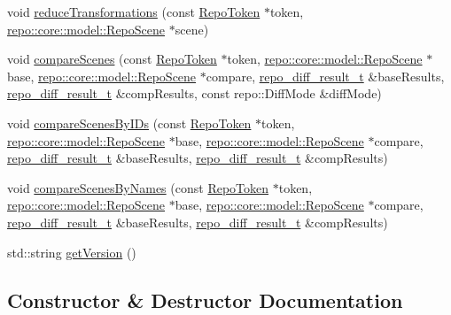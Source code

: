 \begin{DoxyCompactItemize}
void \hyperlink{classrepo_1_1_repo_controller_af77b1253d7a6b6cf00fc94764a3bc03a}{reduce\+Transformations} (const \hyperlink{class_repo_controller_1_1_repo_token}{Repo\+Token} $\ast$token, \hyperlink{classrepo_1_1core_1_1model_1_1_repo_scene}{repo\+::core\+::model\+::\+Repo\+Scene} $\ast$scene)
\item 
void \hyperlink{classrepo_1_1_repo_controller_a811a7007a5739cf66ce738a4ebcd850d}{compare\+Scenes} (const \hyperlink{class_repo_controller_1_1_repo_token}{Repo\+Token} $\ast$token, \hyperlink{classrepo_1_1core_1_1model_1_1_repo_scene}{repo\+::core\+::model\+::\+Repo\+Scene} $\ast$base, \hyperlink{classrepo_1_1core_1_1model_1_1_repo_scene}{repo\+::core\+::model\+::\+Repo\+Scene} $\ast$compare, \hyperlink{structrepo__diff__result__t}{repo\+\_\+diff\+\_\+result\+\_\+t} \&base\+Results, \hyperlink{structrepo__diff__result__t}{repo\+\_\+diff\+\_\+result\+\_\+t} \&comp\+Results, const repo\+::\+Diff\+Mode \&diff\+Mode)
\item 
void \hyperlink{classrepo_1_1_repo_controller_a22fd8472979a26231cf574e90f10437a}{compare\+Scenes\+By\+I\+Ds} (const \hyperlink{class_repo_controller_1_1_repo_token}{Repo\+Token} $\ast$token, \hyperlink{classrepo_1_1core_1_1model_1_1_repo_scene}{repo\+::core\+::model\+::\+Repo\+Scene} $\ast$base, \hyperlink{classrepo_1_1core_1_1model_1_1_repo_scene}{repo\+::core\+::model\+::\+Repo\+Scene} $\ast$compare, \hyperlink{structrepo__diff__result__t}{repo\+\_\+diff\+\_\+result\+\_\+t} \&base\+Results, \hyperlink{structrepo__diff__result__t}{repo\+\_\+diff\+\_\+result\+\_\+t} \&comp\+Results)
\item 
void \hyperlink{classrepo_1_1_repo_controller_a0ac4dab08fbd4d2f7864ecab9fd36462}{compare\+Scenes\+By\+Names} (const \hyperlink{class_repo_controller_1_1_repo_token}{Repo\+Token} $\ast$token, \hyperlink{classrepo_1_1core_1_1model_1_1_repo_scene}{repo\+::core\+::model\+::\+Repo\+Scene} $\ast$base, \hyperlink{classrepo_1_1core_1_1model_1_1_repo_scene}{repo\+::core\+::model\+::\+Repo\+Scene} $\ast$compare, \hyperlink{structrepo__diff__result__t}{repo\+\_\+diff\+\_\+result\+\_\+t} \&base\+Results, \hyperlink{structrepo__diff__result__t}{repo\+\_\+diff\+\_\+result\+\_\+t} \&comp\+Results)
\item 
std\+::string \hyperlink{classrepo_1_1_repo_controller_a57dd6871469d8db08574fbce74496fb9}{get\+Version} ()
\end{DoxyCompactItemize}


\subsection{Constructor \& Destructor Documentation}
\hypertarget{classrepo_1_1_repo_controller_ac96f092e2b21994a9db27413cc8c9b51}{}
